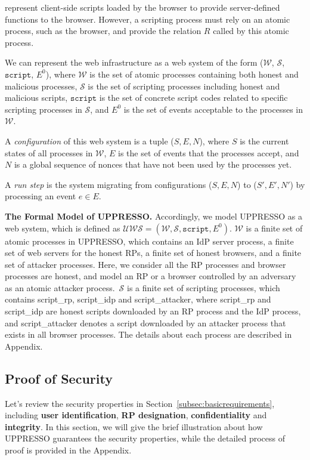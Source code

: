  represent client-side scripts loaded by the browser to provide server-defined functions to the browser. However, a scripting process must rely on an atomic process, such as the browser, and provide the relation $R$ called by this atomic process.


 We can represent the web infrastructure as a web system of the form ($\mathcal{W}$, $\mathcal{S}$, $\mathtt{script}$, $E^0$), where $\mathcal{W}$ is the set of atomic processes containing both honest and malicious processes, $\mathcal{S}$ is the set of scripting processes including honest and malicious scripts, $\mathtt{script}$ is the set of concrete script codes related to specific scripting processes in $\mathcal{S}$, and $E^0$ is the set of events acceptable to the processes in $\mathcal{W}$.

\noindent A {\em configuration} of this web system is a tuple ($S, E, N$), where $S$ is the current states of all processes in $\mathcal{W}$, $E$ is the set of events that the processes accept, and $N$ is a global sequence of nonces that have not been used by the processes yet.

\noindent A {\em run step} is the system migrating from configurations ($S, E, N$) to ($S', E', N'$) by processing an event $e \in E$.

\noindent\textbf{The Formal Model of UPPRESSO.}
Accordingly, we model UPPRESSO as a web system, which is defined as $\mathcal{UWS} = (\mathcal{W}, \mathcal{S}, \mathtt{script}, E^0)$. $\mathcal{W}$ is a finite set of atomic processes in UPPRESSO, which contains an IdP server process, a finite set of web servers for the honest RPs, a finite set of honest browsers, and a finite set of attacker processes. Here, we consider all the RP processes and browser processes are honest, and model an RP or a browser controlled by an adversary as an atomic attacker process.\
$\mathcal{S}$ is a finite set of scripting processes, which contains {\sf script\_rp}, {\sf script\_idp} and {\sf script\_attacker}, where {\sf script\_rp} and {\sf script\_idp} are honest scripts downloaded by an RP process and the IdP process, and {\sf script\_attacker} denotes a script downloaded by an attacker process that exists in all browser processes.
The details about each process are described in Appendix.


\subsection{Proof of Security}
Let's review the security properties in Section~\ref{subsec:basicrequirements}, including \textbf{user identification}, \textbf{RP designation}, \textbf{confidentiality} and \textbf{integrity}. In this section, we will give the brief illustration about how UPPRESSO guarantees the security properties, while the detailed process of proof is provided in the Appendix.

